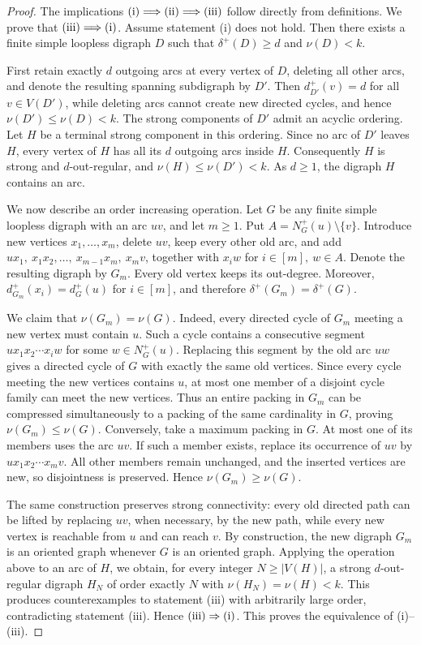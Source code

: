 \documentclass[a4paper,12pt]{article}
\numberwithin{equation}{section}
\begin{document}
\begin{proof}
The implications $\textup{(i)}\Longrightarrow\textup{(ii)}\Longrightarrow\textup{(iii)}$ follow directly from definitions. We prove that $\textup{(iii)}\Longrightarrow\textup{(i)}$. Assume statement (i) does not hold. Then there exists a finite simple loopless digraph $D$ such that $\delta^+(D)\ge d$ and $\nu(D)<k$.

First retain exactly $d$ outgoing arcs at every vertex of $D$, deleting all other arcs, and denote the resulting spanning subdigraph by $D'$. Then $d_{D'}^+(v)=d$ for all $v\in V(D')$, while deleting arcs cannot create new directed cycles, and hence $\nu(D')\le \nu(D)<k$. The strong components of $D'$ admit an acyclic ordering. Let $H$ be a terminal strong component in this ordering.
  Since no arc of $D'$ leaves $H$, every vertex of $H$ has all its $d$ outgoing arcs inside $H$. Consequently $H$ is strong and $d$-out-regular, and $\nu(H)\le \nu(D')<k$. As $d\ge1$, the digraph $H$ contains an arc.

We now describe an order increasing operation. Let $G$ be any finite simple loopless digraph with an arc $uv$, and let $m\ge1$. Put $A=N_G^+(u)\setminus\{v\}$. Introduce new vertices $x_1,\ldots,x_m$, delete $uv$, keep every other old arc, and add $ux_1,\ x_1x_2,\ldots,\ x_{m-1}x_m,\ x_mv$, together with $x_iw$ for $i\in[m],\ w\in A$. Denote the resulting digraph by $G_m$. Every old vertex keeps its out-degree. Moreover, $d_{G_m}^+(x_i)=d_G^+(u)$ for $i\in[m]$, and therefore $\delta^+(G_m)=\delta^+(G)$.

We claim that $\nu(G_m)=\nu(G)$. Indeed, every directed cycle of $G_m$ meeting a new vertex must contain $u$. Such a cycle contains a consecutive segment $ux_1x_2\cdots x_iw$ for some $w\in N_G^+(u)$. Replacing this segment by the old arc $uw$ gives a directed cycle of $G$ with exactly the same old vertices. Since every cycle meeting the new vertices contains $u$, at most one member of a disjoint cycle family can meet the new vertices. Thus an entire packing in $G_m$ can be compressed simultaneously to a packing of the same cardinality in $G$, proving $\nu(G_m)\le \nu(G)$. Conversely, take a maximum packing in $G$. At most one of its members uses the arc $uv$. If such a member exists, replace its occurrence of $uv$ by $ux_1x_2\cdots x_mv$. All other members remain unchanged, and the inserted vertices are new, so disjointness is preserved. Hence $\nu(G_m)\ge \nu(G)$. 

The same construction preserves strong connectivity: every old directed path can be lifted by replacing $uv$, when necessary, by the new path, while every new vertex is reachable from $u$ and can reach $v$. By construction, the new digraph $G_m$ is an oriented graph whenever $G$ is an oriented graph. Applying the operation above to an arc of $H$, we obtain, for every integer $N\ge |V(H)|$, a strong $d$-out-regular digraph $H_N$ of order exactly $N$ with $\nu(H_N)=\nu(H)<k$. This produces counterexamples to statement (iii) with arbitrarily large order, contradicting statement (iii). Hence $\textup{(iii)}\Rightarrow\textup{(i)}$. This proves the equivalence of (i)--(iii).
\end{proof}
\end{document}
